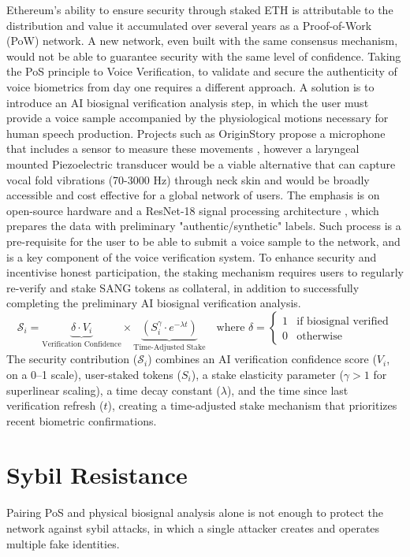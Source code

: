 \documentclass[11pt,a4paper]{article}
\begin{document}
Ethereum's ability to ensure security through staked ETH is attributable to the distribution and value it accumulated over several years as a Proof-of-Work (PoW) network.
A new network, even built with the same consensus mechanism, would not be able to guarantee security with the same level of confidence.
Taking the PoS principle to Voice Verification, to validate and secure the authenticity of voice biometrics from day one requires a different approach.
A solution is to introduce an AI biosignal verification analysis step, in which the user must provide a voice sample accompanied by the physiological motions necessary for human speech production.
Projects such as OriginStory propose a microphone that includes a sensor to measure these movements \cite{ftc2024originstory}, however a laryngeal mounted Piezoelectric transducer would be a viable alternative that can capture vocal fold vibrations (70-3000 Hz) through neck skin and would be broadly accessible and cost effective for a global network of users.
The emphasis is on open-source hardware and a ResNet-18 signal processing architecture \cite{liu2025machine}, which prepares the data with preliminary "authentic/synthetic" labels.
Such process is a pre-requisite for the user to be able to submit a voice sample to the network, and is a key component of the voice verification system.
To enhance security and incentivise honest participation, the staking mechanism requires users to regularly re-verify and stake SANG tokens as collateral, in addition to successfully completing the preliminary AI biosignal verification analysis.
\begin{equation}
    \mathcal{S}_i = \underbrace{\delta \cdot V_i}_{\text{Verification Confidence}} \times \underbrace{\left(S_i^{\gamma} \cdot e^{-\lambda t}\right)}_{\text{Time-Adjusted Stake}} \quad \text{where } \delta = \begin{cases} 
    1 & \text{if biosignal verified} \\
    0 & \text{otherwise}
    \end{cases}
    \end{equation}
    The security contribution ($\mathcal{S}_i$) combines an AI verification confidence score ($V_i$, on a 0--1 scale), user-staked tokens ($S_i$), a stake elasticity parameter ($\gamma > 1$ for superlinear scaling), a time decay constant ($\lambda$), and the time since last verification refresh ($t$), creating a time-adjusted stake mechanism that prioritizes recent biometric confirmations.
\section{Sybil Resistance}
\label{sec:methodology}
Pairing PoS and physical biosignal analysis alone is not enough to protect the network against sybil attacks, in which a single attacker creates and operates multiple fake identities.
\end{document}
